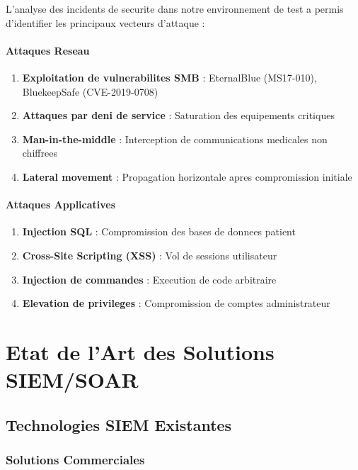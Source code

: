 L'analyse des incidents de securite dans notre environnement de test a permis d'identifier les principaux vecteurs d'attaque :

\paragraph{Attaques Reseau}
\begin{enumerate}
    \item \textbf{Exploitation de vulnerabilites SMB} : EternalBlue (MS17-010), BluekeepSafe (CVE-2019-0708)
    \item \textbf{Attaques par deni de service} : Saturation des equipements critiques
    \item \textbf{Man-in-the-middle} : Interception de communications medicales non chiffrees
    \item \textbf{Lateral movement} : Propagation horizontale apres compromission initiale
\end{enumerate}

\paragraph{Attaques Applicatives}
\begin{enumerate}
    \item \textbf{Injection SQL} : Compromission des bases de donnees patient
    \item \textbf{Cross-Site Scripting (XSS)} : Vol de sessions utilisateur
    \item \textbf{Injection de commandes} : Execution de code arbitraire
    \item \textbf{Elevation de privileges} : Compromission de comptes administrateur
\end{enumerate}

\section{Etat de l'Art des Solutions SIEM/SOAR}

\subsection{Technologies SIEM Existantes}

\subsubsection{Solutions Commerciales}

